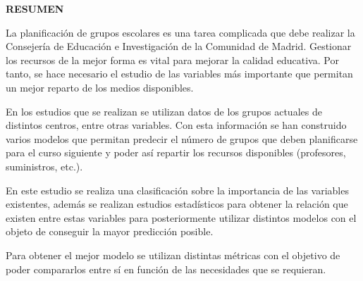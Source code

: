 \documentclass[spanish,12pt,a4paper,twoside,openright]{report}
\newcommand\blankpage{%
	\null
	\thispagestyle{empty}%
	\addtocounter{page}{-1}%
	\newpage}
\begin{document}

\begin{titlepage}
	
	\begin{flushright}
		{\large \bf RESUMEN}
		\\
		\vspace{10pt}
		\textit{}
		{La planificación de grupos escolares es una tarea complicada que debe realizar la Consejería de Educación e Investigación de la Comunidad de Madrid. Gestionar los recursos de la mejor forma es vital para mejorar la calidad educativa. Por tanto, se hace necesario el estudio de las variables más importante que permitan un mejor reparto de los medios disponibles.
	
	En los estudios que se realizan se utilizan datos de los grupos actuales de distintos centros, entre otras variables. Con esta información se han construido varios modelos que permitan predecir el número de grupos que deben planificarse para el curso siguiente y poder así repartir los recursos disponibles (profesores, suministros, etc.).
	
	En este estudio se realiza una clasificación sobre la importancia de las variables existentes, además se realizan estudios estadísticos para obtener la relación que existen entre estas variables para posteriormente utilizar distintos modelos con el objeto de conseguir la mayor predicción posible.
	
	Para obtener el mejor modelo se utilizan distintas métricas con el objetivo de poder compararlos entre sí en función de las necesidades que se requieran.

		} %
	\end{flushright}
\end{titlepage}
\blankpage
\end{document}
